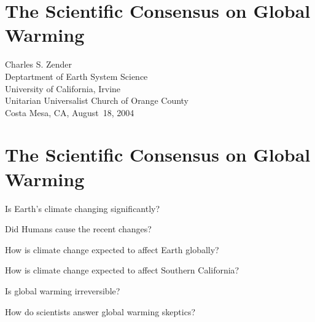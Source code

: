 \documentclass[12pt]{article}
\begin{document}
\section{The Scientific Consensus on Global Warming}
\begin{center}
Charles S. Zender\\
Deptartment of Earth System Science\\
University of California, Irvine\\
\bigskip
\bigskip
\bigskip
Unitarian Universalist Church of Orange County\\
Costa Mesa, CA, August~18, 2004\\
\bigskip
\normalsize
\end{center}

\section{The Scientific Consensus on Global Warming}
\begin{itemize*}
\item Is Earth's climate changing significantly?
\item Did Humans cause the recent changes?
\item How is climate change expected to affect Earth globally?
\item How is climate change expected to affect Southern California?
\item Is global warming irreversible? 
\item How do scientists answer global warming skeptics?   
\end{itemize*}
\end{document}
